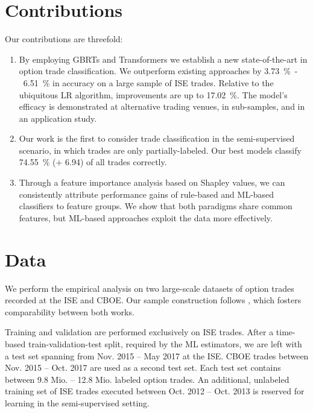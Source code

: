 \section{Contributions}

Our contributions are threefold: 
\begin{enumerate}[label=(\roman*),noitemsep]
\item By employing \glspl{GBRT} and Transformers we establish a new state-of-the-art in option trade classification. We outperform existing approaches by \SI{3.73}{\percent}~-~\SI{6.51}{\percent} in accuracy on a large sample of \gls{ISE} trades. Relative to the ubiquitous \gls{LR} algorithm, improvements are up to \SI{17.02}{\percent}. 
The model's efficacy is demonstrated at alternative trading venues, in sub-samples, and in an application study.
\item Our work is the first to consider trade classification in the semi-supervised scenario, in which trades are only partially-labeled. Our best models classify \SI{74.55}{\percent} (+ 6.94) of all trades correctly.
\item Through a feature importance analysis based on Shapley values, we can consistently attribute performance gains of rule-based and \gls{ML}-based classifiers to feature groups. We show that both paradigms share common features, but \gls{ML}-based approaches exploit the data more effectively.
\end{enumerate}

\section{Data}

We perform the empirical analysis on two large-scale datasets of option trades recorded at the \gls{ISE} and \gls{CBOE}. Our sample construction follows \textcite[][]{grauerOptionTradeClassification2022}, which fosters comparability between both works. 

Training and validation are performed exclusively on \gls{ISE} trades. After a time-based train-validation-test split, required by the \gls{ML} estimators, we are left with a test set spanning from Nov. 2015 -- May 2017 at the \gls{ISE}. \gls{CBOE} trades between Nov. 2015 -- Oct. 2017 are used as a second test set. Each test set contains between 9.8 Mio. --  12.8 Mio. labeled option trades. An additional, unlabeled training set of \gls{ISE} trades executed between Oct. 2012 -- Oct. 2013 is reserved for learning in the semi-supervised setting.

